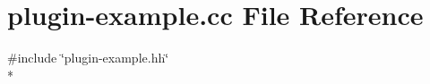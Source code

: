 \hypertarget{plugin-example_8cc}{\section{plugin-\/example.cc File Reference}
\label{plugin-example_8cc}
}
{\ttfamily \#include \char`\"{}plugin-\/example.\-hh\char`\"{}}\\*
